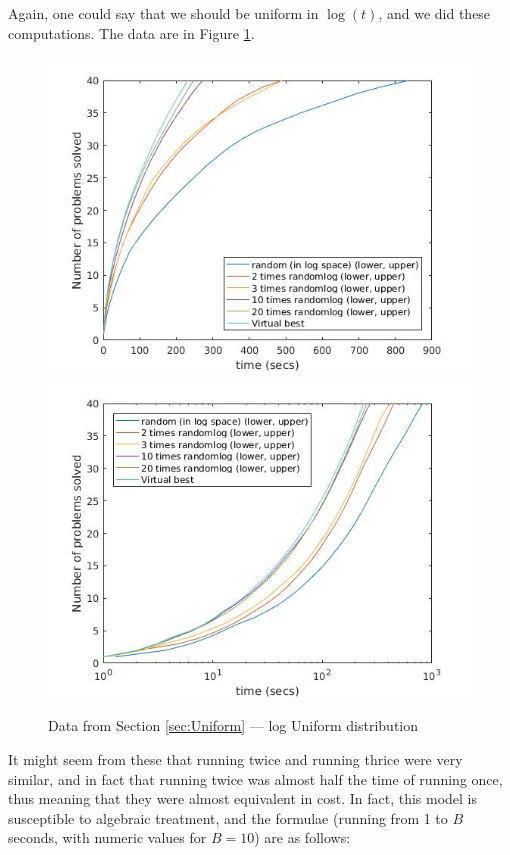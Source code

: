 \documentclass{easychair}
\begin{document}
Again, one could say that we should be uniform in $\log(t)$, and we did these computations.
The data are in Figure  \ref{Fig:Uniformlog}.
\begin{figure}[h]
\caption{Data from Section \ref{sec:Uniform} --- log Uniform distribution\label{Fig:Uniformlog}}
\includegraphics[scale=0.4]{Runiflog20.jpg}
\includegraphics[scale=0.4]{Rloguniflog20.jpg}
\end{figure}
It might seem from these that running twice and running thrice were very similar, and in fact that running twice was almost half the time of running once, thus meaning that they were almost equivalent in cost. In fact, this model is susceptible to algebraic treatment,
and the formulae (running from 1 to $B$ seconds, with numeric values for $B=10$) are as follows:
\end{document}
